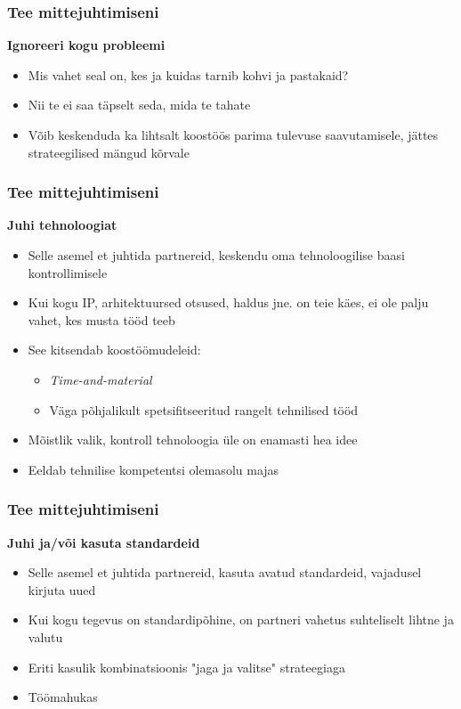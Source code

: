 \begin{frame}[fragile]
  \frametitle{Tee mittejuhtimiseni}
	\textbf{Ignoreeri kogu probleemi}
	\begin{itemize}
		\item Mis vahet seal on, kes ja kuidas tarnib kohvi ja pastakaid?
		\item Nii te ei saa täpselt seda, mida te tahate
		\item Võib keskenduda ka lihtsalt koostöös parima tulevuse saavutamisele, jättes strateegilised mängud kõrvale
	\end{itemize}
\end{frame}

\begin{frame}[fragile]
  \frametitle{Tee mittejuhtimiseni}
		\textbf{Juhi tehnoloogiat}
	\begin{itemize}
		\item Selle asemel et juhtida partnereid, keskendu oma tehnoloogilise baasi kontrollimisele
		\item Kui kogu IP, arhitektuursed otsused, haldus jne. on teie käes, ei ole palju vahet, kes musta tööd teeb
		\item See kitsendab koostöömudeleid:
		\begin{itemize}
			\item \emph{Time-and-material}
			\item Väga põhjalikult spetsifitseeritud rangelt tehnilised tööd
		\end{itemize}
		\item Mõistlik valik, kontroll tehnoloogia üle on enamasti hea idee
		\item Eeldab tehnilise kompetentsi olemasolu majas
	\end{itemize}
\end{frame}

\begin{frame}[fragile]
  \frametitle{Tee mittejuhtimiseni}
		\textbf{Juhi ja/või kasuta standardeid}
	\begin{itemize}
		\item Selle asemel et juhtida partnereid, kasuta avatud standardeid, vajadusel kirjuta uued
		\item Kui kogu tegevus on standardipõhine, on partneri vahetus suhteliselt lihtne ja valutu
		\item Eriti kasulik kombinatsioonis "jaga ja valitse" strateegiaga
		\item Töömahukas
	\end{itemize}
\end{frame}

